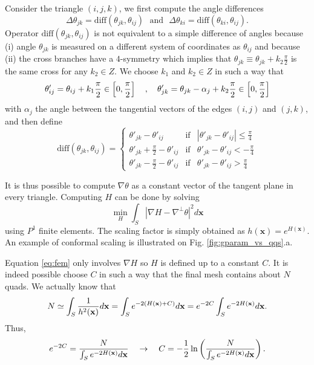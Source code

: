 \documentclass[AMA,STIX1COL]{WileyNJD-v2}
\newcommand{\vx}{\ensuremath{\mathbf{x}}}
\newcommand\rfig[1]{Fig. \ref{#1}}
\begin{document}
{Consider the triangle $(i,j,k)$, we first compute the angle differences
$$
\Delta \theta_{jk} = \text{diff}(\theta_{jk},
\theta_{ij})~~~\text{and}~~~
\Delta \theta_{ki} = \text{diff}(\theta_{ki},
\theta_{ij}).
$$
Operator $\text{diff}(\theta_{jk},\theta_{ij})$ is not equivalent to
a simple difference of angles because (i) angle $\theta_{jk}$ is
measured on a different system of coordinates as $\theta_{ij}$ and 
because (ii) the cross branches have a $4$-symmetry which
implies that $\theta_{jk} \equiv \theta_{jk}+k_2\frac{\pi}{2}$ is the 
same cross for any $k_2 \in Z$. We choose $k_1$ and $k_2 \in Z$ in such a way that 
$$
\theta'_{ij} = \theta_{ij} + k_1{\pi \over 2} \in
\left[0,\frac{\pi}{2}\right]~~~,~~~
\theta'_{jk} = \theta_{jk} - \alpha_j + k_2{\pi \over 2} \in
\left[0,\frac{\pi}{2}\right]
$$ 
with $\alpha_j$ the angle between the tangential vectors of the edges $(i,j)$ and $(j,k)$, 
and then define
$$\text{diff}(\theta_{jk},\theta_{ij}) = \left\{
\begin{array}{lcr}
\theta'_{jk} - \theta'_{ij}& \text{if} & |\theta'_{jk} - \theta'_{ij}|
                                         \leq \frac{\pi}{4}\\
\theta'_{jk} + \frac{\pi}{2} - \theta'_{ij}& \text{if} & \theta'_{jk} - \theta'_{ij}
                                         < -\frac{\pi}{4}\\
\theta'_{jk} - \frac{\pi}{2} - \theta'_{ij}& \text{if} & \theta'_{jk} - \theta'_{ij}
                                         >  \frac{\pi}{4}
\end{array}
\right.
$$

It is thus possible to compute $\nabla \theta$ as a constant vector
of the tangent plane in every triangle. Computing $H$ can be done
by solving 
\begin{equation}
\min_{H} \int_{S}| \nabla H - \nabla^\perp
  \theta|^2d\vx
\label{eq:fem}
\end{equation}
using $P^1$ finite elements.
The scaling factor is simply obtained as $h(\vx) = e^{H(\vx)}$.
An example of conformal scaling is illustrated on \rfig{fig:gparam_vs_qqs}.a.

Equation \eqref{eq:fem}
only involves $\nabla H$ so $H$ is defined up to a constant $C$. It is
indeed possible choose $C$ in such a way that the final mesh
contains about $N$ quads. We actually know that 
$$N \simeq \int_S {1 \over h^2 (\vx)}d \vx = \int_S e^{-2(H (\vx)+C)}
d \vx = e^{-2C} \int_S e^{-2H (\vx)} d \vx.$$
Thus,
$$e^{-2C} = {N \over \int_S e^{-2H (\vx)} d \vx}~~~\rightarrow~~~C =
-{1 \over 2} \ln \left( {N \over \int_S e^{-2H (\vx)} d \vx}\right).$$


}
\end{document}
